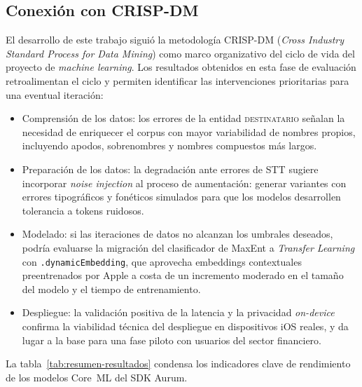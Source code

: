 \subsection{Conexión con CRISP-DM}
\label{subsec:crisp-dm}

El desarrollo de este trabajo siguió la metodología CRISP-DM (\textit{Cross Industry Standard Process for Data Mining}) como marco organizativo del ciclo de vida del proyecto de \textit{machine learning}. Los resultados obtenidos en esta fase de evaluación retroalimentan el ciclo y permiten identificar las intervenciones prioritarias para una eventual iteración:

\begin{itemize}
    \item Comprensión de los datos: los errores de la entidad \textsc{destinatario} señalan la necesidad de enriquecer el corpus con
    mayor variabilidad de nombres propios, incluyendo apodos, sobrenombres y nombres compuestos más largos.

    \item Preparación de los datos: la degradación ante errores de STT sugiere incorporar \textit{noise injection} al proceso de aumentación:
    generar variantes con errores tipográficos y fonéticos simulados para que los modelos desarrollen tolerancia a tokens ruidosos.

    \item Modelado: si las iteraciones de datos no alcanzan los umbrales deseados, podría evaluarse la migración del clasificador de
    MaxEnt a \textit{Transfer Learning} con \texttt{.dynamicEmbedding}, que aprovecha embeddings contextuales preentrenados por Apple a costa de
    un incremento moderado en el tamaño del modelo y el tiempo de entrenamiento.

    \item Despliegue: la validación positiva de la latencia y la privacidad \textit{on-device} confirma la viabilidad técnica del
    despliegue en dispositivos iOS reales, y da lugar a la base para una fase piloto con usuarios del sector financiero.
\end{itemize}

\medskip

La tabla~\ref{tab:resumen-resultados} condensa los indicadores clave de
rendimiento de los modelos Core~ML del SDK Aurum.

